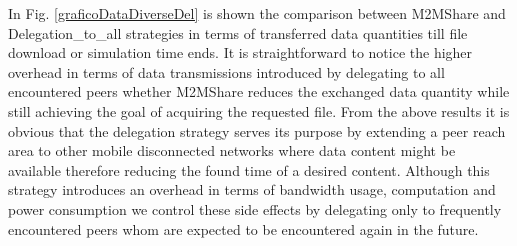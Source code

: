 In Fig. \ref{graficoDataDiverseDel} is shown the comparison between M2MShare and Delegation\_to\_all strategies in terms of transferred data quantities till file download or simulation time ends. It is straightforward to notice the higher overhead in terms of data transmissions introduced by delegating to all encountered peers whether M2MShare reduces the exchanged data quantity while still achieving the goal of acquiring the requested file. From the above results it is obvious that the delegation strategy serves its purpose by extending a peer reach area to other mobile disconnected networks where data content might be available therefore reducing the found time of a desired content.
Although this strategy introduces an overhead in terms of bandwidth usage, computation and power consumption we control these side effects by delegating only to frequently encountered peers whom are expected to be encountered again in the future.



\newpage 

